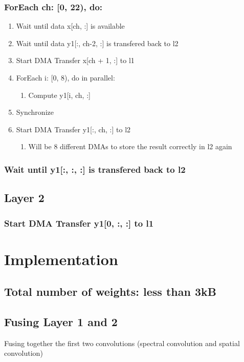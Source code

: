 \documentclass[11pt]{article}
\begin{document}
\subsubsection{ForEach ch: [0, 22), do:}
\label{sec:org38bddd3}
\begin{enumerate}
\item Wait until data x[ch, :] is available
\label{sec:org265520f}
\item Wait until data y1[:, ch-2, :] is transfered back to l2
\label{sec:orgce46aab}
\item Start DMA Transfer x[ch + 1, :] to l1
\label{sec:orgfb5cb88}
\item ForEach i: [0, 8), do in parallel:
\label{sec:org9af4525}
\begin{enumerate}
\item Compute y1[i, ch, :]
\label{sec:org8c80e2c}
\end{enumerate}
\item Synchronize
\label{sec:org4c10fe9}
\item Start DMA Transfer  y1[:, ch, :] to l2
\label{sec:org20ee52d}
\begin{enumerate}
\item Will be 8 different DMAs to store the result correctly in l2 again
\label{sec:orgce72d71}
\end{enumerate}
\end{enumerate}
\subsubsection{Wait until y1[:, :, :] is transfered back to l2}
\label{sec:org0623b44}
\subsection{Layer 2}
\label{sec:orgd4e0942}
\subsubsection{Start DMA Transfer y1[0, :, :] to l1}
\label{sec:orgc121e3b}
\section{Implementation}
\label{sec:org6167c34}
\subsection{Total number of weights: less than 3kB}
\label{sec:org2db747d}
\subsection{Fusing Layer 1 and 2}
\label{sec:org14462de}
Fusing together the first two convolutions (spectral convolution and spatial convolution)
\end{document}

